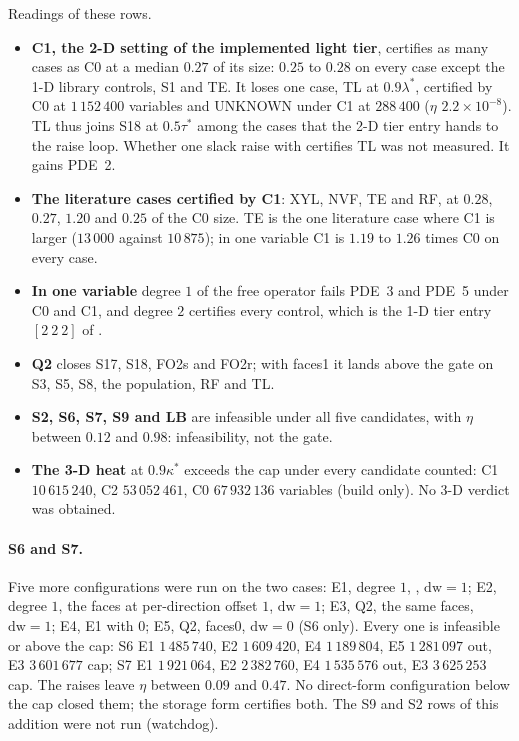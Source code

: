 Readings of these rows.
\begin{itemize}\setlength\itemsep{0pt}
\item \textbf{C1, the 2-D setting of the implemented light tier}, certifies as many cases as C0 at a median $0.27$ of its size: $0.25$ to $0.28$ on every case except the 1-D library controls, S1 and TE. It loses one case, TL at $0.9\lambda^*$, certified by C0 at $1\,152\,400$ variables and UNKNOWN under C1 at $288\,400$ ($\eta$ $2.2\times10^{-8}$). TL thus joins S18 at $0.5\tau^*$ among the cases that the 2-D tier entry  hands to the raise loop. Whether one slack raise with  certifies TL was not measured. It gains PDE~2.
\item \textbf{The literature cases certified by C1}: XYL, NVF, TE and RF, at $0.28$, $0.27$, $1.20$ and $0.25$ of the C0 size. TE is the one literature case where C1 is larger ($13\,000$ against $10\,875$); in one variable C1 is $1.19$ to $1.26$ times C0 on every case.
\item \textbf{In one variable} degree $1$ of the free operator fails PDE~3 and PDE~5 under C0 and C1, and degree $2$ certifies every control, which is the 1-D tier entry $[2\ 2\ 2]$ of .
\item \textbf{Q2} closes S17, S18, FO2s and FO2r; with faces1 it lands above the gate on S3, S5, S8, the population, RF and TL.
\item \textbf{S2, S6, S7, S9 and LB} are infeasible under all five candidates, with $\eta$ between $0.12$ and $0.98$: infeasibility, not the gate.
\item \textbf{The 3-D heat} at $0.9\kappa^*$ exceeds the cap under every candidate counted: C1 $10\,615\,240$, C2 $53\,052\,461$, C0 $67\,932\,136$ variables (build only). No 3-D verdict was obtained.
\end{itemize}

\paragraph{S6 and S7.} Five more configurations were run on the two cases: E1, degree $1$, , $\mathrm{dw}=1$; E2, degree $1$, the faces at per-direction offset $1$, $\mathrm{dw}=1$; E3, Q2, the same faces, $\mathrm{dw}=1$; E4, E1 with  $0$; E5, Q2, faces0, $\mathrm{dw}=0$ (S6 only). Every one is infeasible or above the cap: S6 E1 $1\,485\,740$, E2 $1\,609\,420$, E4 $1\,189\,804$, E5 $1\,281\,097$ out, E3 $3\,601\,677$ cap; S7 E1 $1\,921\,064$, E2 $2\,382\,760$, E4 $1\,535\,576$ out, E3 $3\,625\,253$ cap. The raises leave $\eta$ between $0.09$ and $0.47$. No direct-form configuration below the cap closed them; the storage form certifies both. The S9 and S2 rows of this addition were not run (watchdog).

